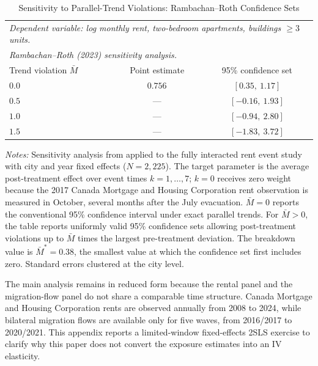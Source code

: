 \documentclass[12pt]{article}
\begin{document}
\begin{table}[!htbp]
   \centering
   \begin{threeparttable}
   \caption{\label{tab:rambachan_roth} Sensitivity to Parallel-Trend Violations: Rambachan--Roth Confidence Sets}
   \small
   \begin{tabular}{lcc}
      \toprule
      \multicolumn{3}{l}{\textit{Dependent variable: log monthly rent, two-bedroom apartments, buildings $\geq 3$ units.}} \\
      \multicolumn{3}{l}{\textit{Rambachan--Roth (2023) sensitivity analysis.}} \\
      \addlinespace
      Trend violation $\bar{M}$ & Point estimate & 95\% confidence set \\
      \midrule
      $0.0$ & $0.756$ & $[0.35,\ 1.17]$ \\
      $0.5$ & ---     & $[-0.16,\ 1.93]$ \\
      $1.0$ & ---     & $[-0.94,\ 2.80]$ \\
      $1.5$ & ---     & $[-1.83,\ 3.72]$ \\
      \bottomrule
   \end{tabular}
   \begin{tablenotes}[flushleft]
      \footnotesize
      \item \textit{Notes:} Sensitivity analysis from \citet{rambachan2023} applied
      to the fully interacted rent event study with city and year fixed
      effects ($N=2{,}225$). The target parameter is the average
      post-treatment effect over event times $k=1,\ldots,7$; $k=0$
      receives zero weight because the 2017 Canada Mortgage and Housing
      Corporation rent observation is measured in October, several months
      after the July evacuation.
      $\bar{M}=0$ reports the conventional 95\% confidence interval
      under exact parallel trends. For $\bar{M}>0$, the table reports
      uniformly valid 95\% confidence sets allowing post-treatment
      violations up to $\bar{M}$ times the largest pre-treatment
      deviation. The breakdown value is $\bar{M}^{*}=0.38$, the
      smallest value at which the confidence set first includes zero.
      Standard errors clustered at the city level.
   \end{tablenotes}
   \end{threeparttable}
\end{table}

The main analysis remains in reduced form because the rental panel and the
migration-flow panel do not share a comparable time structure. Canada Mortgage and Housing Corporation rents are
observed annually from 2008 to 2024, while bilateral migration flows are
available only for five waves, from 2016/2017 to 2020/2021. This appendix reports
a limited-window fixed-effects 2SLS exercise to clarify why this paper does not convert the
exposure estimates into an IV elasticity.
\end{document}
